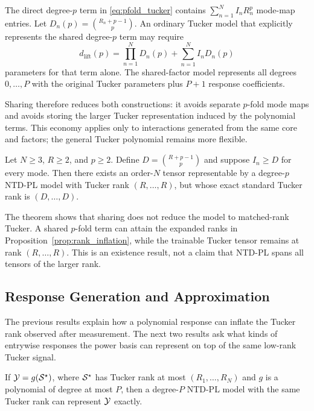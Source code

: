 \begin{corollary}
\label{cor:tied_lift_parameters}
The direct degree-$p$ term in \eqref{eq:pfold_tucker} contains
$\sum_{n=1}^{N}I_nR_n^p$ mode-map entries. Let
$D_n(p)=\binom{R_n+p-1}{p}$. An ordinary Tucker model that explicitly
represents the shared degree-$p$ term may require
\begin{equation}
  d_{\mathrm{lift}}(p)=\prod_{n=1}^{N}D_n(p)+\sum_{n=1}^{N}I_nD_n(p)
\end{equation}
parameters for that term alone. The shared-factor model represents all degrees
$0,\ldots,P$ with the original Tucker parameters plus $P+1$ response
coefficients.
\end{corollary}

Sharing therefore reduces both constructions: it avoids separate $p$-fold mode
maps and avoids storing the larger Tucker representation induced by the
polynomial terms. This economy applies only to interactions generated from the
same core and factors; the general Tucker polynomial remains more flexible.

\begin{theorem}
\label{thm:tucker_separation}
Let \(N\ge 3\), \(R\ge 2\), and \(p\ge 2\). Define
\(D=\binom{R+p-1}{p}\) and suppose \(I_n\ge D\) for every mode. Then there
exists an order-\(N\) tensor representable by a degree-\(p\)
NTD-PL model with Tucker rank \((R,\ldots,R)\), but whose
exact standard Tucker rank is \((D,\ldots,D)\).
\end{theorem}

The theorem shows that sharing does not reduce the model to matched-rank
Tucker. A shared $p$-fold term can attain the expanded ranks in
Proposition~\ref{prop:rank_inflation}, while the trainable Tucker tensor remains
at rank \((R,\ldots,R)\). This is an existence result, not a claim that NTD-PL
spans all tensors of the larger rank.

\subsection{Response Generation and Approximation}

The previous results explain how a polynomial response can inflate the Tucker
rank observed after measurement. The next two results ask what kinds of
entrywise responses the power basis can represent on top of the same
low-rank Tucker signal.

\begin{proposition}
\label{prop:poly_generation}
If $\mathcal{Y}=g(\mathcal{S}^\star)$, where $\mathcal{S}^\star$ has Tucker rank at most
$(R_1,\ldots,R_N)$ and $g$ is a polynomial of degree at most $P$, then a
degree-$P$ NTD-PL model with the same Tucker rank can
represent $\mathcal{Y}$ exactly.
\end{proposition}


